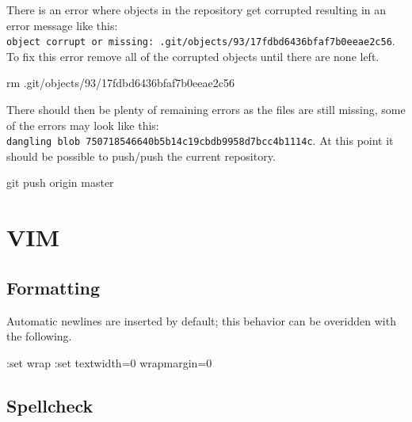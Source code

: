 \documentclass[]{book}
\newenvironment{Shaded}{\begin{snugshade}}{\end{snugshade}}
\newcommand{\ExtensionTok}[1]{#1}
\newcommand{\FunctionTok}[1]{\textcolor[rgb]{0.00,0.00,0.00}{#1}}
\newcommand{\NormalTok}[1]{#1}
\begin{document}
There is an error where objects in the repository get corrupted resulting in an error message like this: \texttt{object\ corrupt\ or\ missing:\ .git/objects/93/17fdbd6436bfaf7b0eeae2c56}.\\
To fix this error remove all of the corrupted objects until there are none left.

\begin{Shaded}
\begin{Highlighting}[]
\FunctionTok{rm}\NormalTok{ .git/objects/93/17fdbd6436bfaf7b0eeae2c56}
\end{Highlighting}
\end{Shaded}

There should then be plenty of remaining errors as the files are still missing, some of the errors may look like this: \texttt{dangling\ blob\ 750718546640b5b14c19cbdb9958d7bcc4b1114c}. At this point it should be possible to push/push the current repository.

\begin{Shaded}
\begin{Highlighting}[]
\FunctionTok{git}\NormalTok{ push origin master}
\end{Highlighting}
\end{Shaded}

\hypertarget{vim}{%
\chapter{VIM}\label{vim}}

\hypertarget{formatting}{%
\section{Formatting}\label{formatting}}

Automatic newlines are inserted by default; this behavior can be overidden with the following.

\begin{Shaded}
\begin{Highlighting}[]
\NormalTok{:}\ExtensionTok{set}\NormalTok{ wrap}
\NormalTok{:}\ExtensionTok{set}\NormalTok{ textwidth=0 wrapmargin=0}
\end{Highlighting}
\end{Shaded}

\hypertarget{spellcheck}{%
\section{Spellcheck}\label{spellcheck}}
\end{document}
